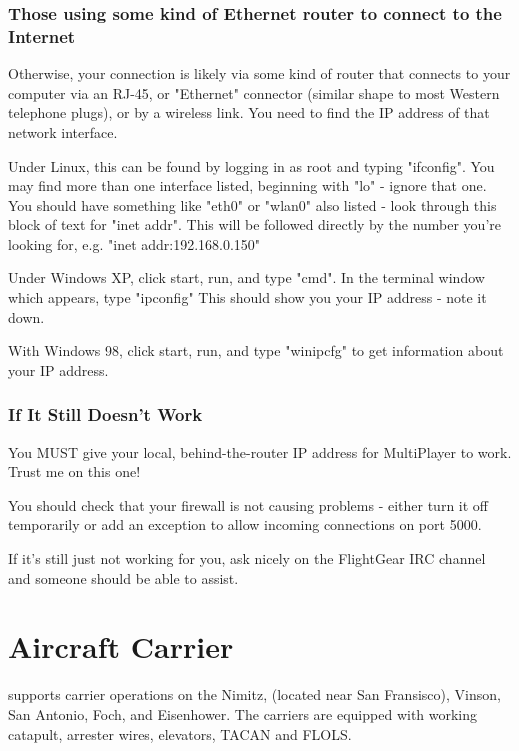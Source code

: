 \subsubsection{Those using some kind of Ethernet router to connect to the Internet}

Otherwise, your connection is likely via some kind of router that connects to your computer via an RJ-45, or "Ethernet" connector
(similar shape to most Western telephone plugs), or by a wireless link. You need to find the IP address of that network interface.

Under Linux, this can be found by logging in as root and typing "ifconfig". You may find more than one interface listed,
beginning with "lo" - ignore that one. You should have something like "eth0" or "wlan0" also listed - look through this block
of text for "inet addr". This will be followed directly by the number you're looking for, e.g. "inet addr:192.168.0.150"

Under Windows XP, click start, run, and type "cmd". In the terminal window which appears, type "ipconfig"
This should show you your IP address - note it down.

With Windows 98, click start, run, and type "winipcfg" to get information about your IP address.

\subsubsection{If It Still Doesn't Work}

You MUST give your local, behind-the-router IP address for MultiPlayer to work. Trust me on this one!

You should check that your firewall is not causing problems - either turn it off temporarily or add an exception
to allow incoming connections on port 5000.

If it's still just not working for you, ask nicely on the FlightGear IRC channel and someone should be able to assist.

\section{Aircraft Carrier}\label{carrier}

\FlightGear{} supports carrier operations on the Nimitz, (located near San Fransisco), Vinson, San Antonio, Foch, and Eisenhower.
The carriers are equipped with working catapult, arrester wires, elevators, TACAN and FLOLS.

